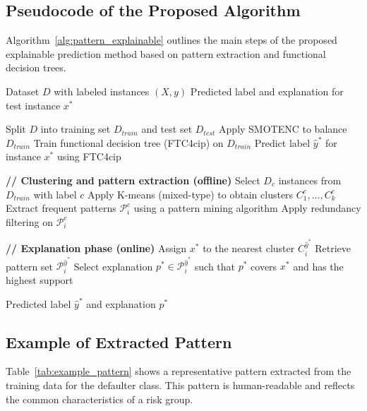 \subsection{Pseudocode of the Proposed Algorithm}

Algorithm~\ref{alg:pattern_explainable} outlines the main steps of the proposed explainable prediction method based on pattern extraction and functional decision trees.

\begin{algorithm}[H]
\caption{Explainable Credit Risk Prediction based on Patterns}
\label{alg:pattern_explainable}
\begin{algorithmic}[1]
\REQUIRE Dataset $D$ with labeled instances $(X, y)$
\ENSURE Predicted label and explanation for test instance $x^*$

\STATE Split $D$ into training set $D_{train}$ and test set $D_{test}$
\STATE Apply SMOTENC to balance $D_{train}$
\STATE Train functional decision tree (FTC4cip) on $D_{train}$
\STATE Predict label $\hat{y}^*$ for instance $x^*$ using FTC4cip

\STATE \textbf{// Clustering and pattern extraction (offline)}
    \STATE Select $D_{c}$ instances from $D_{train}$ with label $c$
    \STATE Apply K-means (mixed-type) to obtain clusters $C_1^c, ..., C_k^c$
        \STATE Extract frequent patterns $\mathcal{P}_i^c$ using a pattern mining algorithm
        \STATE Apply redundancy filtering on $\mathcal{P}_i^c$
    \ENDFOR
\ENDFOR

\STATE \textbf{// Explanation phase (online)}
\STATE Assign $x^*$ to the nearest cluster $C_i^{\hat{y}^*}$
\STATE Retrieve pattern set $\mathcal{P}_i^{\hat{y}^*}$
\STATE Select explanation $p^* \in \mathcal{P}_i^{\hat{y}^*}$ such that $p^*$ covers $x^*$ and has the highest support

\RETURN Predicted label $\hat{y}^*$ and explanation $p^*$
\end{algorithmic}
\end{algorithm}



\subsection{Example of Extracted Pattern}

Table~\ref{tab:example_pattern} shows a representative pattern extracted from the training data for the defaulter class. This pattern is human-readable and reflects the common characteristics of a risk group.

